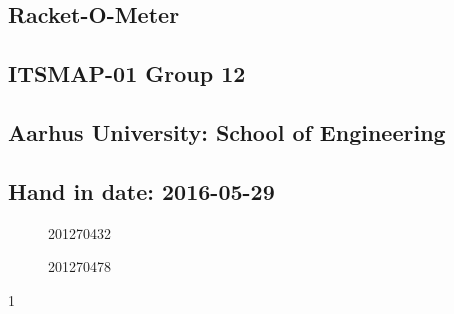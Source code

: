 \begingroup
\renewcommand{\cleardoublepage}{}
\renewcommand{\clearpage}{}

\begin{titlingpage}

\chapter*{Racket-O-Meter}

\section*{ITSMAP-01 Group 12}
\section*{Aarhus University: School of Engineering}

\section*{Hand in date: 2016-05-29}

\begin{figure}[h]
	\center
	\vspace{9cm}
	\signature{Bjørn Sørensen}{201270432}
	\signature{Jesper O. Christensen}{201270478}
\end{figure}

\vspace{5.5cm}
\begin{center}
1
\end{center}

\end{titlingpage}
\endgroup
\clearpage
